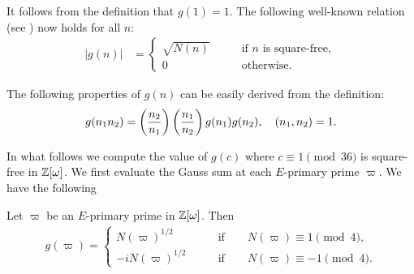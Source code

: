 \documentclass[twoside,leqno,10pt, A4]{amsart}
\begin{document}
   It follows from the definition that $g(1)=1$. The following well-known relation (see \cite{Diac}) now holds for all $n$:
\begin{align*}
   |g(n)|& =\begin{cases}
    \sqrt{N(n)} \qquad & \text{if $n$ is square-free}, \\
     0 \qquad & \text{otherwise}.
    \end{cases}
\end{align*}

   The following properties of $g(n)$ can be easily derived from the definition:
\begin{align}
\label{2.03}
   g(n_1 n_2) =\left(\frac{n_2}{n_1}\right)\left(\frac{n_1}{n_2}\right)g(n_1) g(n_2), \quad (n_1, n_2) = 1.
\end{align}

   In what follows we compute the value of $g(c)$ where $c \equiv 1 \pmod {36}$ is square-free in $\mathbb Z[\omega]$.
We first evaluate the Gauss sum at each $E$-primary prime $\varpi$. We have the following
\begin{lemma}
\label{Gausssum}
   Let $\varpi$ be an $E$-primary prime in $\mathbb Z[\omega]$. Then
\begin{align*}
   g(\varpi)= \begin{cases}
    N(\varpi)^{1/2} \qquad & \text{if} \qquad N(\varpi) \equiv 1 \pmod 4,\\
    -i N(\varpi)^{1/2} \qquad & \text{if} \qquad N(\varpi) \equiv -1 \pmod 4.
\end{cases}
\end{align*}
\end{lemma}
\end{document}

